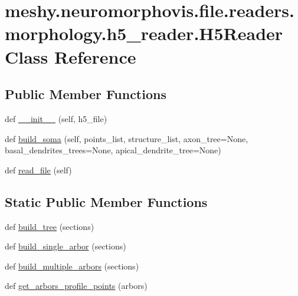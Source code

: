 \hypertarget{classmeshy_1_1neuromorphovis_1_1file_1_1readers_1_1morphology_1_1h5__reader_1_1H5Reader}{}\section{meshy.\+neuromorphovis.\+file.\+readers.\+morphology.\+h5\+\_\+reader.\+H5\+Reader Class Reference}
\label{classmeshy_1_1neuromorphovis_1_1file_1_1readers_1_1morphology_1_1h5__reader_1_1H5Reader}


 


\subsection*{Public Member Functions}
\begin{DoxyCompactItemize}
\item 
def \hyperlink{classmeshy_1_1neuromorphovis_1_1file_1_1readers_1_1morphology_1_1h5__reader_1_1H5Reader_a4649a6131610c05792999cb998f8ccd6}{\+\_\+\+\_\+init\+\_\+\+\_\+} (self, h5\+\_\+file)
\item 
def \hyperlink{classmeshy_1_1neuromorphovis_1_1file_1_1readers_1_1morphology_1_1h5__reader_1_1H5Reader_aa96e65837183cfaa96722ad32ea40425}{build\+\_\+soma} (self, points\+\_\+list, structure\+\_\+list, axon\+\_\+tree=None, basal\+\_\+dendrites\+\_\+trees=None, apical\+\_\+dendrite\+\_\+tree=None)
\item 
def \hyperlink{classmeshy_1_1neuromorphovis_1_1file_1_1readers_1_1morphology_1_1h5__reader_1_1H5Reader_a9d2b7c04a7167cc7d48b4c2446c6dd3b}{read\+\_\+file} (self)
\end{DoxyCompactItemize}
\subsection*{Static Public Member Functions}
\begin{DoxyCompactItemize}
\item 
def \hyperlink{classmeshy_1_1neuromorphovis_1_1file_1_1readers_1_1morphology_1_1h5__reader_1_1H5Reader_a851f6bbd7157f8be85a5eb522b9ca8a4}{build\+\_\+tree} (sections)
\item 
def \hyperlink{classmeshy_1_1neuromorphovis_1_1file_1_1readers_1_1morphology_1_1h5__reader_1_1H5Reader_a746569000c4984ce6b2c18e76503f6c7}{build\+\_\+single\+\_\+arbor} (sections)
\item 
def \hyperlink{classmeshy_1_1neuromorphovis_1_1file_1_1readers_1_1morphology_1_1h5__reader_1_1H5Reader_a9ddb149026f34cca2f38ea978dcf9ede}{build\+\_\+multiple\+\_\+arbors} (sections)
\item 
def \hyperlink{classmeshy_1_1neuromorphovis_1_1file_1_1readers_1_1morphology_1_1h5__reader_1_1H5Reader_a0994394555573e21b099c78b09e1fb00}{get\+\_\+arbors\+\_\+profile\+\_\+points} (arbors)
\end{DoxyCompactItemize}

